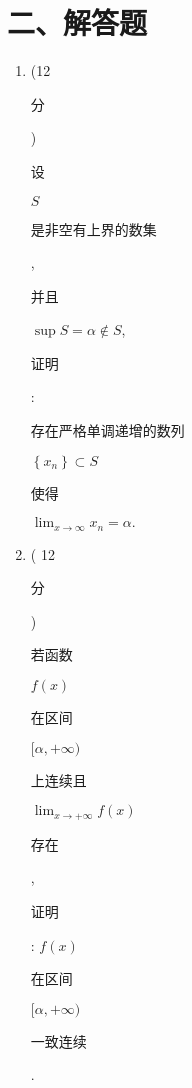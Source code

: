 \documentclass[10pt]{article}
\begin{document}
\section{二、解答题}
\begin{enumerate}
  \item (12 \begin{CJK}{UTF8}{mj}分\end{CJK}) \begin{CJK}{UTF8}{mj}设\end{CJK} $S$ \begin{CJK}{UTF8}{mj}是非空有上界的数集\end{CJK}, \begin{CJK}{UTF8}{mj}并且\end{CJK} $\sup S=\alpha \notin S$, \begin{CJK}{UTF8}{mj}证明\end{CJK}: \begin{CJK}{UTF8}{mj}存在严格单调递增的数列\end{CJK} $\left\{x_{n}\right\} \subset S$ \begin{CJK}{UTF8}{mj}使得\end{CJK} $\lim _{x \rightarrow \infty} x_{n}=\alpha .$

  \item ( 12 \begin{CJK}{UTF8}{mj}分\end{CJK}) \begin{CJK}{UTF8}{mj}若函数\end{CJK} $f(x)$ \begin{CJK}{UTF8}{mj}在区间\end{CJK} $[\alpha,+\infty)$ \begin{CJK}{UTF8}{mj}上连续且\end{CJK} $\lim _{x \rightarrow+\infty} f(x)$ \begin{CJK}{UTF8}{mj}存在\end{CJK}, \begin{CJK}{UTF8}{mj}证明\end{CJK}: $f(x)$ \begin{CJK}{UTF8}{mj}在区间\end{CJK} $[\alpha,+\infty)$ \begin{CJK}{UTF8}{mj}一致连续\end{CJK}.


\end{enumerate}
\end{document}
